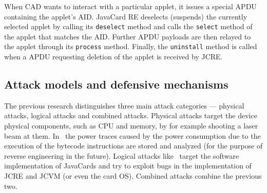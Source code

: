\documentclass{../llncs/llncs}
\begin{document}
When CAD wants to interact with a particular applet, it issues a special APDU containing the applet's AID. JavaCard RE deselects (suspends) the currently selected applet by calling its \texttt{deselect} method and calls the \texttt{select} method of the applet that matches the AID. Further APDU payloads are then relayed to the applet through its \texttt{process} method. Finally, the \texttt{uninstall} method is called when a APDU requesting deletion of the applet is received by JCRE.


    \subsection{Attack models and defensive mechanisms}
    The previous research distinguishes three main attack categories --- physical attacks, logical attacks and combined attacks. Physical attacks target the device physical components, such as CPU and memory, by for example shooting a laser beam at them. In~\cite{Prpic2010thesis} the power traces caused by the power consumption due to the execution of the bytecode instructions are stored and analyzed (for the purpose of reverse engineering in the future).
    Logical attacks like~\cite{hogenboom} target the software implementation of JavaCards and try to exploit bugs in the implementation of JCRE and JCVM (or even the card OS). Combined attacks combine the previous two.

\end{document}
